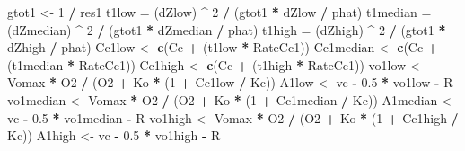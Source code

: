 \documentclass[
]{krantz}
\makeatletter
\newenvironment{Shaded}{\begin{snugshade}}{\end{snugshade}}
\newcommand{\DecValTok}[1]{\textcolor[rgb]{0.00,0.00,0.81}{#1}}
\newcommand{\FloatTok}[1]{\textcolor[rgb]{0.00,0.00,0.81}{#1}}
\newcommand{\KeywordTok}[1]{\textcolor[rgb]{0.13,0.29,0.53}{\textbf{#1}}}
\newcommand{\NormalTok}[1]{#1}
\newcommand{\OperatorTok}[1]{\textcolor[rgb]{0.81,0.36,0.00}{\textbf{#1}}}
\newcommand{\StringTok}[1]{\textcolor[rgb]{0.31,0.60,0.02}{#1}}
\newenvironment{kframe}{%
\medskip{}
\setlength{\fboxsep}{.8em}
 \def\at@end@of@kframe{}%
 \ifinner\ifhmode%
  \def\at@end@of@kframe{\end{minipage}}%
  \begin{minipage}{\columnwidth}%
 \fi\fi%
 \def\FrameCommand##1{\hskip\@totalleftmargin \hskip-\fboxsep
 \colorbox{shadecolor}{##1}\hskip-\fboxsep
     \hskip-\linewidth \hskip-\@totalleftmargin \hskip\columnwidth}%
 \MakeFramed {\advance\hsize-\width
   \@totalleftmargin\z@ \linewidth\hsize
   \@setminipage}}%
 {\par\unskip\endMakeFramed%
 \at@end@of@kframe}
\renewenvironment{Shaded}{\begin{kframe}}{\end{kframe}}
\makeatother
\begin{document}
\begin{Shaded}
\begin{Highlighting}[]
\NormalTok{gtot1 \textless{}{-}}\StringTok{ }\DecValTok{1} \OperatorTok{/}\StringTok{ }\NormalTok{res1}
\NormalTok{t1low =}\StringTok{ }\NormalTok{(dZlow) }\OperatorTok{\^{}}\StringTok{ }\DecValTok{2} \OperatorTok{/}\StringTok{ }\NormalTok{(gtot1 }\OperatorTok{*}\StringTok{ }\NormalTok{dZlow }\OperatorTok{/}\StringTok{ }\NormalTok{phat)}
\NormalTok{t1median =}\StringTok{ }\NormalTok{(dZmedian) }\OperatorTok{\^{}}\StringTok{ }\DecValTok{2} \OperatorTok{/}\StringTok{ }\NormalTok{(gtot1 }\OperatorTok{*}\StringTok{ }\NormalTok{dZmedian }\OperatorTok{/}\StringTok{ }\NormalTok{phat)}
\NormalTok{t1high =}\StringTok{ }\NormalTok{(dZhigh) }\OperatorTok{\^{}}\StringTok{ }\DecValTok{2} \OperatorTok{/}\StringTok{ }\NormalTok{(gtot1 }\OperatorTok{*}\StringTok{ }\NormalTok{dZhigh }\OperatorTok{/}\StringTok{ }\NormalTok{phat)}
\NormalTok{Cc1low \textless{}{-}}\StringTok{ }\KeywordTok{c}\NormalTok{(Cc }\OperatorTok{+}\StringTok{ }\NormalTok{(t1low }\OperatorTok{*}\StringTok{ }\NormalTok{RateCc1))}
\NormalTok{Cc1median \textless{}{-}}\StringTok{ }\KeywordTok{c}\NormalTok{(Cc }\OperatorTok{+}\StringTok{ }\NormalTok{(t1median }\OperatorTok{*}\StringTok{ }\NormalTok{RateCc1))}
\NormalTok{Cc1high \textless{}{-}}\StringTok{ }\KeywordTok{c}\NormalTok{(Cc }\OperatorTok{+}\StringTok{ }\NormalTok{(t1high }\OperatorTok{*}\StringTok{ }\NormalTok{RateCc1))}
\NormalTok{vo1low \textless{}{-}}\StringTok{ }\NormalTok{Vomax }\OperatorTok{*}\StringTok{ }\NormalTok{O2 }\OperatorTok{/}\StringTok{ }\NormalTok{(O2 }\OperatorTok{+}\StringTok{ }\NormalTok{Ko }\OperatorTok{*}\StringTok{ }\NormalTok{(}\DecValTok{1} \OperatorTok{+}\StringTok{ }\NormalTok{Cc1low }\OperatorTok{/}\StringTok{ }\NormalTok{Kc)) }
\NormalTok{A1low \textless{}{-}}\StringTok{ }\NormalTok{vc }\OperatorTok{{-}}\StringTok{ }\FloatTok{0.5} \OperatorTok{*}\StringTok{ }\NormalTok{vo1low }\OperatorTok{{-}}\StringTok{ }\NormalTok{R }
\NormalTok{vo1median \textless{}{-}}\StringTok{ }\NormalTok{Vomax }\OperatorTok{*}\StringTok{ }\NormalTok{O2 }\OperatorTok{/}\StringTok{ }\NormalTok{(O2 }\OperatorTok{+}\StringTok{ }\NormalTok{Ko }\OperatorTok{*}\StringTok{ }\NormalTok{(}\DecValTok{1} \OperatorTok{+}\StringTok{ }\NormalTok{Cc1median }\OperatorTok{/}\StringTok{ }\NormalTok{Kc)) }
\NormalTok{A1median \textless{}{-}}\StringTok{ }\NormalTok{vc }\OperatorTok{{-}}\StringTok{ }\FloatTok{0.5} \OperatorTok{*}\StringTok{ }\NormalTok{vo1median }\OperatorTok{{-}}\StringTok{ }\NormalTok{R }
\NormalTok{vo1high \textless{}{-}}\StringTok{ }\NormalTok{Vomax }\OperatorTok{*}\StringTok{ }\NormalTok{O2 }\OperatorTok{/}\StringTok{ }\NormalTok{(O2 }\OperatorTok{+}\StringTok{ }\NormalTok{Ko }\OperatorTok{*}\StringTok{ }\NormalTok{(}\DecValTok{1} \OperatorTok{+}\StringTok{ }\NormalTok{Cc1high }\OperatorTok{/}\StringTok{ }\NormalTok{Kc)) }
\NormalTok{A1high \textless{}{-}}\StringTok{ }\NormalTok{vc }\OperatorTok{{-}}\StringTok{ }\FloatTok{0.5} \OperatorTok{*}\StringTok{ }\NormalTok{vo1high }\OperatorTok{{-}}\StringTok{ }\NormalTok{R }


\end{Highlighting}
\end{Shaded}
\end{document}
